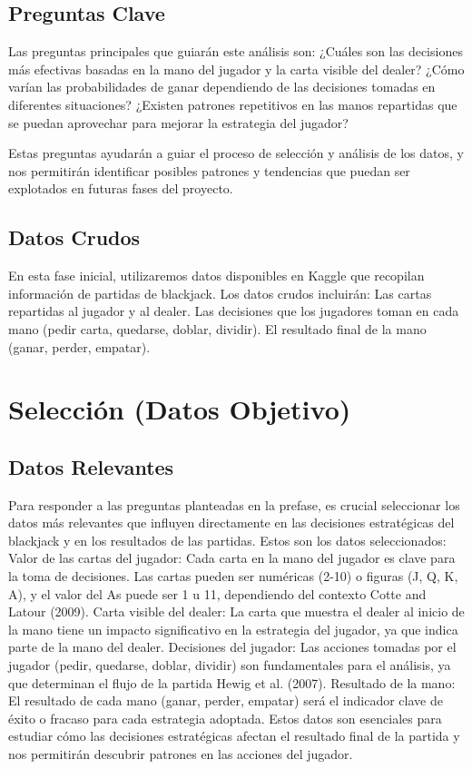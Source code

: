 \documentclass[conference,final,]{IEEEtran}
\begin{document}
\subsection{Preguntas Clave}\label{preguntas-clave}

Las preguntas principales que guiarán este análisis son: ¿Cuáles son las
decisiones más efectivas basadas en la mano del jugador y la carta
visible del dealer? ¿Cómo varían las probabilidades de ganar dependiendo
de las decisiones tomadas en diferentes situaciones? ¿Existen patrones
repetitivos en las manos repartidas que se puedan aprovechar para
mejorar la estrategia del jugador?

Estas preguntas ayudarán a guiar el proceso de selección y análisis de
los datos, y nos permitirán identificar posibles patrones y tendencias
que puedan ser explotados en futuras fases del proyecto.

\subsection{Datos Crudos}\label{datos-crudos}

En esta fase inicial, utilizaremos datos disponibles en Kaggle que
recopilan información de partidas de blackjack. Los datos crudos
incluirán: Las cartas repartidas al jugador y al dealer. Las decisiones
que los jugadores toman en cada mano (pedir carta, quedarse, doblar,
dividir). El resultado final de la mano (ganar, perder, empatar).

\section{Selección (Datos Objetivo)}\label{selecciuxf3n-datos-objetivo}

\subsection{Datos Relevantes}\label{datos-relevantes}

Para responder a las preguntas planteadas en la prefase, es crucial
seleccionar los datos más relevantes que influyen directamente en las
decisiones estratégicas del blackjack y en los resultados de las
partidas. Estos son los datos seleccionados: Valor de las cartas del
jugador: Cada carta en la mano del jugador es clave para la toma de
decisiones. Las cartas pueden ser numéricas (2-10) o figuras (J, Q, K,
A), y el valor del As puede ser 1 u 11, dependiendo del contexto Cotte
and Latour (2009). Carta visible del dealer: La carta que muestra el
dealer al inicio de la mano tiene un impacto significativo en la
estrategia del jugador, ya que indica parte de la mano del dealer.
Decisiones del jugador: Las acciones tomadas por el jugador (pedir,
quedarse, doblar, dividir) son fundamentales para el análisis, ya que
determinan el flujo de la partida Hewig et al. (2007). Resultado de la
mano: El resultado de cada mano (ganar, perder, empatar) será el
indicador clave de éxito o fracaso para cada estrategia adoptada. Estos
datos son esenciales para estudiar cómo las decisiones estratégicas
afectan el resultado final de la partida y nos permitirán descubrir
patrones en las acciones del jugador.
\end{document}
